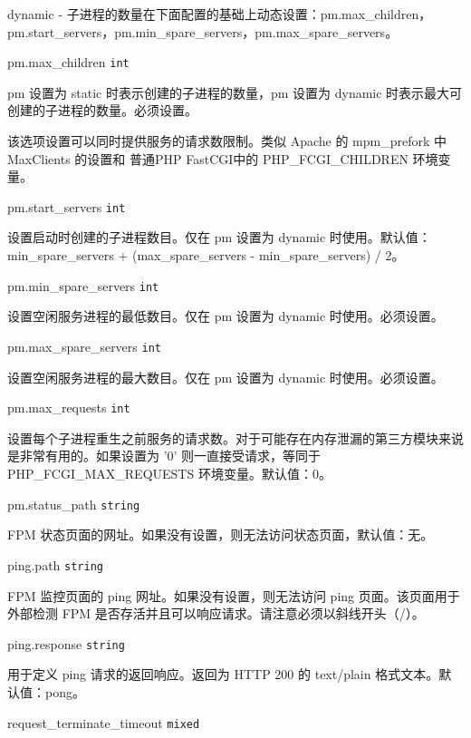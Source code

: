 \begin{compactitem}
\begin{compactenum}
\item dynamic - 子进程的数量在下面配置的基础上动态设置：pm.max\_children，pm.start\_servers，pm.min\_spare\_servers，pm.max\_spare\_servers。
\end{compactenum}


\item pm.max\_children \texttt{int}

pm 设置为 static 时表示创建的子进程的数量，pm 设置为 dynamic 时表示最大可创建的子进程的数量。必须设置。

该选项设置可以同时提供服务的请求数限制。类似 Apache 的 mpm\_prefork 中 MaxClients 的设置和 普通PHP FastCGI中的 PHP\_FCGI\_CHILDREN 环境变量。

\item pm.start\_servers \texttt{int}

设置启动时创建的子进程数目。仅在 pm 设置为 dynamic 时使用。默认值：min\_spare\_servers + (max\_spare\_servers - min\_spare\_servers) / 2。

\item pm.min\_spare\_servers \texttt{int}

设置空闲服务进程的最低数目。仅在 pm 设置为 dynamic 时使用。必须设置。

\item pm.max\_spare\_servers \texttt{int}

设置空闲服务进程的最大数目。仅在 pm 设置为 dynamic 时使用。必须设置。

\item pm.max\_requests \texttt{int}

设置每个子进程重生之前服务的请求数。对于可能存在内存泄漏的第三方模块来说是非常有用的。如果设置为 '0' 则一直接受请求，等同于 PHP\_FCGI\_MAX\_REQUESTS 环境变量。默认值：0。

\item pm.status\_path \texttt{string}

FPM 状态页面的网址。如果没有设置，则无法访问状态页面，默认值：无。

\item ping.path \texttt{string}

FPM 监控页面的 ping 网址。如果没有设置，则无法访问 ping 页面。该页面用于外部检测 FPM 是否存活并且可以响应请求。请注意必须以斜线开头（/）。

\item ping.response \texttt{string}

用于定义 ping 请求的返回响应。返回为 HTTP 200 的 text/plain 格式文本。默认值：pong。

\item request\_terminate\_timeout \texttt{mixed}


\end{compactitem}
